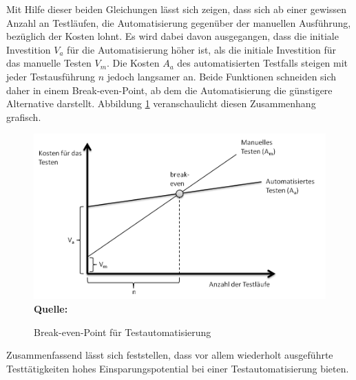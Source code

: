 Mit Hilfe dieser beiden Gleichungen lässt sich zeigen, dass sich ab einer gewissen Anzahl an Testläufen, die Automatisierung gegenüber der manuellen Ausführung, bezüglich der Kosten lohnt.
Es wird dabei davon ausgegangen, dass die initiale Investition \(V_a\) für die Automatisierung höher ist, als die initiale Investition für das manuelle Testen \(V_m\).
Die Kosten \(A_a\) des automatisierten Testfalls steigen mit jeder Testausführung \(n\) jedoch langsamer an. Beide Funktionen schneiden sich daher in einem Break-even-Point, ab dem die Automatisierung die günstigere Alternative darstellt.
Abbildung \ref{fig:breakEven} veranschaulicht diesen Zusammenhang grafisch.

\begin{figure}[htb]
  \centering  
  \includegraphics[scale=0.8]{img/breakeven.png}\\
  \footnotesize\sffamily\textbf{Quelle:} \cite{ramler_economic_2006}
  \caption{Break-even-Point für Testautomatisierung}
  \label{fig:breakEven}
\end{figure}

Zusammenfassend lässt sich feststellen, dass vor allem wiederholt ausgeführte Testtätigkeiten hohes Einsparungspotential bei einer Testautomatisierung bieten.


